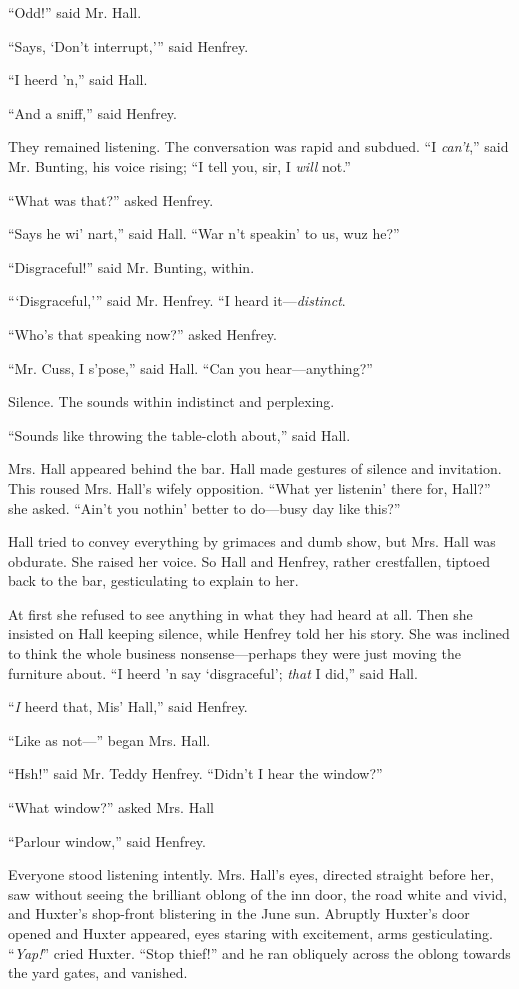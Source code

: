 “Odd!” said Mr. Hall.

“Says, ‘Don’t interrupt,’\kern1pt” said Henfrey.

“I heerd ’n,” said Hall.

“And a sniff,” said Henfrey.

They remained listening. The conversation was rapid and subdued. “I \emph{can’t},” said Mr. Bunting, his voice rising; “I tell you, sir, I \emph{will} not.”

“What was that?” asked Henfrey.

{“Says he wi’ nart,” said Hall. “War n’t speakin’ to us, wuz he?”}

“Disgraceful!” said Mr. Bunting, within.

“\kern1pt‘Disgraceful,’\kern1pt” said Mr. Henfrey. “I heard it—\emph{distinct}.

“Who’s that speaking now?” asked Henfrey.

“Mr. Cuss, I s’pose,” said Hall. “Can you hear—anything?”

Silence. The sounds within indistinct and perplexing.

“Sounds like throwing the table-cloth about,” said Hall.

Mrs. Hall appeared behind the bar. Hall made gestures of silence and invitation. This roused Mrs. Hall’s wifely opposition. “What yer listenin’ there for, Hall?” she asked. “Ain’t you nothin’ better to do—busy day like this?”

Hall tried to convey everything by grimaces and dumb show, but Mrs. Hall was obdurate. She raised her voice. So Hall and Henfrey, rather crestfallen, tiptoed back to the bar, gesticulating to explain to her.

At first she refused to see anything in what they had heard at all. Then she insisted on Hall keeping silence, while Henfrey told her his story. She was inclined to think the whole business nonsense—perhaps they were just moving the furniture about. “I heerd ’n say ‘disgraceful’; \emph{that} I did,” said Hall.

“\emph{I} heerd that, Mis’ Hall,” said Henfrey.

“Like as not—” began Mrs. Hall.

“Hsh!” said Mr. Teddy Henfrey. “Didn’t I hear the window?”

“What window?” asked Mrs. Hall

“Parlour window,” said Henfrey.

Everyone stood listening intently. Mrs. Hall’s eyes, directed straight before her, saw without seeing the brilliant oblong of the inn door, the road white and vivid, and Huxter’s shop-front blistering in the June sun. Abruptly Huxter’s door opened and Huxter appeared, eyes staring with excitement, arms gesticulating. “\emph{Yap!}” cried Huxter. “Stop thief!” and he ran obliquely across the oblong towards the yard gates, and vanished.

